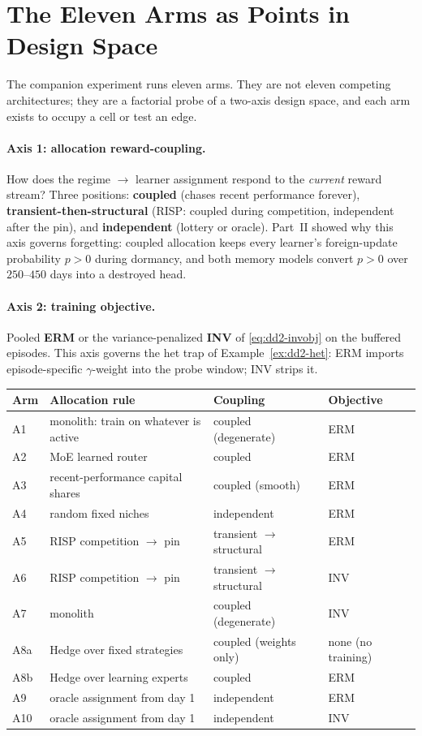 \documentclass[11pt,a4paper]{article}
\theoremstyle{definition}
\theoremstyle{plain}
\newcommand{\nm}{\textsc{RISP}}
\begin{document}
\section{The Eleven Arms as Points in Design Space}
\label{sec:dd2-arms}

The companion experiment runs eleven arms. They are not eleven competing
architectures; they are a factorial probe of a two-axis design space, and
each arm exists to occupy a cell or test an edge.

\paragraph{Axis 1: allocation reward-coupling.} How does the regime
$\to$ learner assignment respond to the \emph{current} reward stream?
Three positions: \textbf{coupled} (chases recent performance forever),
\textbf{transient-then-structural} (\nm{}: coupled during competition,
independent after the pin), and \textbf{independent} (lottery or oracle).
Part~II showed why this axis governs forgetting: coupled allocation keeps
every learner's foreign-update probability $p > 0$ during dormancy, and both
memory models convert $p > 0$ over $250$--$450$ days into a destroyed head.

\paragraph{Axis 2: training objective.} Pooled \textbf{ERM} or the
variance-penalized \textbf{INV} of \eqref{eq:dd2-invobj} on the buffered
episodes. This axis governs the het trap of Example~\ref{ex:dd2-het}: ERM
imports episode-specific $\gamma$-weight into the probe window; INV strips
it.

\begin{center}
\begin{tabular}{llll}
\toprule
Arm & Allocation rule & Coupling & Objective \\
\midrule
A1 & monolith: train on whatever is active & coupled (degenerate) & ERM \\
A2 & MoE learned router & coupled & ERM \\
A3 & recent-performance capital shares & coupled (smooth) & ERM \\
A4 & random fixed niches & independent & ERM \\
A5 & \nm{} competition $\to$ pin & transient $\to$ structural & ERM \\
A6 & \nm{} competition $\to$ pin & transient $\to$ structural & INV \\
A7 & monolith & coupled (degenerate) & INV \\
A8a & Hedge over fixed strategies & coupled (weights only) & none (no training) \\
A8b & Hedge over learning experts & coupled & ERM \\
A9 & oracle assignment from day 1 & independent & ERM \\
A10 & oracle assignment from day 1 & independent & INV \\
\bottomrule
\end{tabular}
\end{center}
\end{document}
